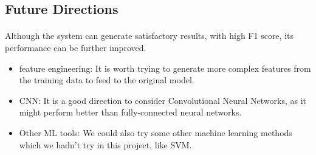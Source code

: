 \documentclass[fleqn,11pt]{olplainarticle}
\begin{document}
\subsection{Future Directions}\label{future}
\paragraph*{}
Although the system can generate satisfactory results, with high F1 score, its performance can be further improved.
\begin{itemize}
\item feature engineering: It is worth trying to generate more complex features from the training data to feed to the original model.
\item CNN: It is a good direction to consider Convolutional Neural Networks, as it might perform better than fully-connected neural networks.
\item Other ML tools: We could also try some other machine learning methods which we hadn't try in this project, like SVM.
\end{itemize}




\end{document}
